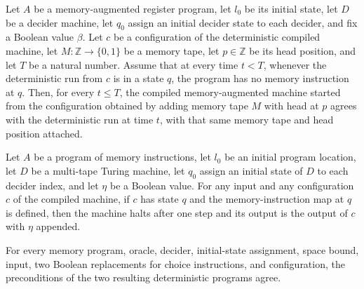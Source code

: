 \begin{lemma}
\label{Complexity.LogProg.mrunFrom_eq}
\leanok
{}
Let $A$ be a memory-augmented register program, let $l_0$ be its initial state, let $D$
be a decider machine, let $q_0$ assign an initial decider state to each decider, and fix
a Boolean value $\beta$. Let $c$ be a configuration of the deterministic compiled
machine, let $M:\mathbb Z\to\{0,1\}$ be a memory tape, let $p\in\mathbb Z$ be its head
position, and let $T$ be a natural number. Assume that at every time $t<T$, whenever the
deterministic run from $c$ is in a state $q$, the program has no memory instruction at
$q$. Then, for every $t\le T$, the compiled memory-augmented machine started from the
configuration obtained by adding memory tape $M$ with head at $p$ agrees with the
deterministic run at time $t$, with that same memory tape and head position attached.
\end{lemma}

\begin{lemma}
\label{Complexity.LogProg.detM_step_mem}
\leanok
{}
Let $A$ be a program of memory instructions, let $l_0$ be an initial program location,
let $D$ be a multi-tape Turing machine, let $q_0$ assign an initial state of $D$ to each
decider index, and let $\eta$ be a Boolean value. For any input and any configuration
$c$ of the compiled machine, if $c$ has state $q$ and the memory-instruction map at $q$
is defined, then the machine halts after one step and its output is the output of $c$
with $\eta$ appended.
\end{lemma}

\begin{lemma}
\label{Complexity.LogProg.pre_mdetPart}
\leanok
{}
For every memory program, oracle, decider, initial-state assignment, space bound, input,
two Boolean replacements for choice instructions, and configuration, the preconditions
of the two resulting deterministic programs agree.
\end{lemma}

